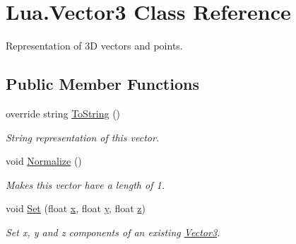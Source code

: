 \hypertarget{class_lua_1_1_vector3}{}\section{Lua.\+Vector3 Class Reference}
\label{class_lua_1_1_vector3}


Representation of 3D vectors and points.  


\subsection*{Public Member Functions}
\begin{DoxyCompactItemize}
\item 
override string \mbox{\hyperlink{class_lua_1_1_vector3_a63129be99b82f76bb94c8267b0dcd692}{To\+String}} ()
\begin{DoxyCompactList}\small\item\em String representation of this vector. \end{DoxyCompactList}\item 
void \mbox{\hyperlink{class_lua_1_1_vector3_a5855d8e4953dffcb076b9e5949406203}{Normalize}} ()
\begin{DoxyCompactList}\small\item\em Makes this vector have a length of 1. \end{DoxyCompactList}\item 
void \mbox{\hyperlink{class_lua_1_1_vector3_a5f40e6344654b7590958df867f1d5b03}{Set}} (float \mbox{\hyperlink{class_lua_1_1_vector3_af2367a6c9fb9484cd8703ef20bbe3e2b}{x}}, float \mbox{\hyperlink{class_lua_1_1_vector3_a93844cc4b95c4b4cc2152ecd3d6a69ed}{y}}, float \mbox{\hyperlink{class_lua_1_1_vector3_a80737d9f0e18357fd716e47a1b82ef6a}{z}})
\begin{DoxyCompactList}\small\item\em Set x, y and z components of an existing \mbox{\hyperlink{class_lua_1_1_vector3}{Vector3}}. \end{DoxyCompactList}\end{DoxyCompactItemize}
